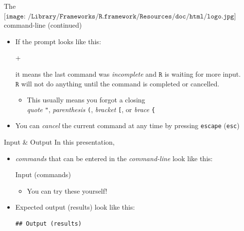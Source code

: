 \documentclass[
  ignorenonframetext,
]{beamer}
\newenvironment{Shaded}{\begin{snugshade}}{\end{snugshade}}
\newcommand{\AlertTok}[1]{\textcolor[rgb]{0.94,0.16,0.16}{#1}}
\newcommand{\NormalTok}[1]{#1}
\newcommand{\StringTok}[1]{\textcolor[rgb]{0.31,0.60,0.02}{#1}}
\providecommand{\tightlist}{%
  \setlength{\itemsep}{0pt}\setlength{\parskip}{0pt}}
\begin{document}
\begin{frame}[fragile]{The
\(\texttt{[image: /Library/Frameworks/R.framework/Resources/doc/html/logo.jpg]}\)
command-line (continued)}
\protect\hypertarget{the-includegraphicsheight1emlibraryframeworksr.frameworkresourcesdochtmllogo.jpg-command-line-continued}{}
\begin{itemize}
\item
  If the prompt looks like this:

\begin{Shaded}
\begin{Highlighting}[]
\NormalTok{+}
\end{Highlighting}
\end{Shaded}

  it means the last command was \emph{incomplete} and \(\texttt{R}\) is
  waiting for more input.\\
  \(\texttt{R}\) will not do anything until the command is completed or
  cancelled.

  \begin{itemize}
  \tightlist
  \item
    This usually means you forgot a closing\\
    \emph{quote} \AlertTok{\texttt{"}}, \emph{parenthesis}
    \AlertTok{\texttt{(}}, \emph{bracket} \AlertTok{\texttt{[}}, or
    \emph{brace} \AlertTok{\texttt{\{}}
  \end{itemize}
\item
  \StringTok{You can \textit{cancel} the current command at any time by pressing \texttt{escape}}
  (\AlertTok{\texttt{esc}})
\end{itemize}
\end{frame}

\begin{frame}[fragile]{Input \& Output}
\protect\hypertarget{input-output}{}
In this presentation,

\begin{itemize}
\item
  \emph{commands} that can be entered in the \emph{command-line} look
  like this:

\hypertarget{format_input}{%
\label{format_input}}%
\begin{Shaded}
\begin{Highlighting}[]
\NormalTok{Input (commands)}
\end{Highlighting}
\end{Shaded}

  \begin{itemize}
  \tightlist
  \item
    You can try these yourself!
  \end{itemize}
\item
  Expected output (results) look like this:

\begin{verbatim}
## Output (results)
\end{verbatim}
\end{itemize}
\end{frame}
\end{document}
